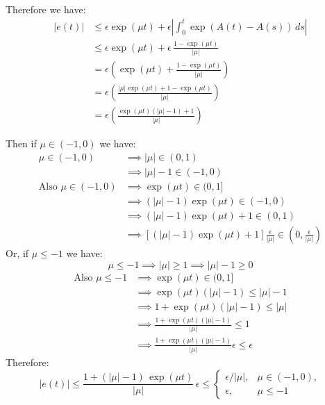 \documentclass[]{article}
\begin{document}
\begin{enumerate}
\noindent Therefore we have:
\begin{align*}
    |e(t)|
    &\leq \epsilon \exp(\mu t) + \epsilon \left|\int_0^t\exp(A(t)-A(s))\,ds\right|\\
    &\leq \epsilon \exp(\mu t) + \epsilon\,\frac{1-\exp({\mu t})}{|\mu|}\\
    &= \epsilon\left( \exp(\mu t) + \frac{1-\exp(\mu t)}{|\mu|}\right)\\
    &= \epsilon\left(\frac{|\mu|\exp(\mu t) + 1 - \exp(\mu t)}{|\mu|}\right)\\
    &= \epsilon\left(\frac{\exp(\mu t)\left(|\mu|-1\right)+1}{|\mu|}\right)
\end{align*}

\noindent Then if $\mu\in(-1,0)$ we have:
\begin{align*}
    \mu \in (-1,0) & \implies |\mu| \in (0,1)\\
    & \implies |\mu| - 1 \in (-1,0)\\
    \text{Also }  \mu \in (-1,0) & \implies \exp(\mu t) \in (0,1] \\
    & \implies \left(|\mu| - 1 \right)\exp(\mu t) \in (-1,0)\\
    & \implies  \left(|\mu| - 1 \right)\exp(\mu t) +1 \in (0,1)\\
        & \implies \left[\left(|\mu| - 1 \right)\exp(\mu t) +1\right] \frac{\epsilon}{|\mu|} \in (0,\frac{\epsilon}{|\mu|})
    \end{align*}
\noindent Or, if $\mu \leq -1$ we have:
\[
\mu \leq -1 \implies |\mu| \geq 1 \implies |\mu|-1 \geq 0
\]
\begin{align*}
  \text{Also }  \mu \leq -1    & \implies \exp({\mu t})\in (0,1] \\
 & \implies    \exp({\mu t}) \left(|\mu| -1 \right) \leq |\mu| -1 \\
 &  \implies    1+\exp({\mu t}) \left(|\mu| -1 \right) \leq |\mu| \\
  &    \implies   \frac{1+\exp({\mu t}) \left(|\mu| -1 \right)}{|\mu|} \leq 1 \\
     &       \implies   \frac{1+\exp({\mu t}) \left(|\mu| -1 \right)}{|\mu|} \epsilon \leq \epsilon  
\end{align*}
\noindent Therefore:
\[
|e(t)| \leq \frac{1+(|\mu|-1)\,\exp({\mu t})}{|\mu|}\,\epsilon  \leq
\begin{cases}
\epsilon/|\mu|, & \mu\in(-1,0),\\[2pt]
\epsilon, & \mu\le -1
\end{cases}
\]


\end{enumerate}
\end{document}
